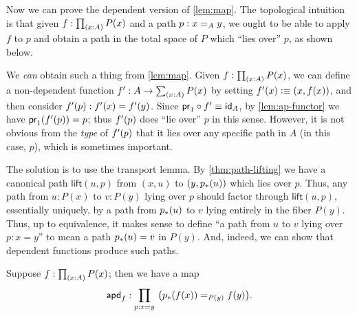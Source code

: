 Now we can prove the dependent version of \autoref{lem:map}.
The topological intuition is that given $f:\prd{x:A} P(x)$ and a path $p:\id[A]xy$, we ought to be able to apply $f$ to $p$ and obtain a path in the total space of $P$ which ``lies over'' $p$, as shown below.

\begin{center}
\end{center}

We \emph{can} obtain such a thing from \autoref{lem:map}.
Given $f:\prd{x:A} P(x)$, we can define a non-dependent function $f':A\to \sm{x:A} P(x)$ by setting $f'(x)\defeq (x,f(x))$, and then consider $\ap{f'}{p} : f'(x) = f'(y)$.
Since $\proj1 \circ f' \jdeq \idfunc[A]$, by \autoref{lem:ap-functor} we have $\ap{\proj1}{\ap{f'}{p}} = p$; thus $\ap{f'}{p}$ does ``lie over'' $p$ in this sense.
However, it is not obvious from the \emph{type} of $\ap{f'}{p}$ that it lies over any specific path in $A$ (in this case, $p$), which is sometimes important.

The solution is to use the transport lemma.
By \autoref{thm:path-lifting} we have a canonical path $\mathsf{lift}(u,p)$ from $(x,u)$ to $(y,\trans p u)$ which lies over $p$.
Thus, any path from $u:P(x)$ to $v:P(y)$ lying over $p$ should factor through $\mathsf{lift}(u,p)$, essentially uniquely, by a path from $\trans p u$ to $v$ lying entirely in the fiber $P(y)$.
Thus, up to equivalence, it makes sense to define ``a path from $u$ to $v$ lying over $p:x=y$'' to mean a path $\trans p u = v$ in $P(y)$.
And, indeed, we can show that dependent functions produce such paths.

\begin{lem}\label{lem:mapdep}
  Suppose $f:\prd{x: A} P(x)$; then we have a map
  \[\apdfunc f : \prd{p:x=y}\big(\id[P(y)]{\trans p{f(x)}}{f(y)}\big).\]
\end{lem}

